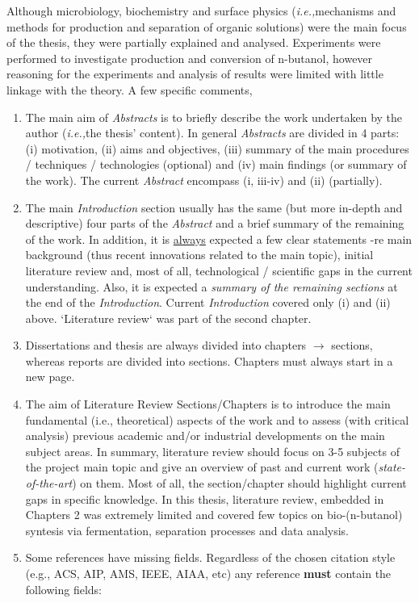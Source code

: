 \documentclass[14pt,twoside]{report}
\newcommand{\ie}{{\it i.e.,}}
\begin{document}
Although microbiology, biochemistry and surface physics (\ie mechanisms and methods for production and separation of organic solutions) were the main focus of the thesis, they were partially explained and analysed. Experiments were performed to investigate production and conversion of n-butanol, however reasoning for the experiments and analysis of results were limited with little linkage with the theory. A few specific comments,
\begin{enumerate}
%
\item The main aim of {\it Abstracts} is to briefly describe the work undertaken by the author (\ie the thesis' content). In general {\it Abstracts} are divided in 4 parts: (i) motivation, (ii) aims and objectives, (iii) summary of the main procedures / techniques / technologies (optional) and (iv) main findings (or summary of the work). The current {\it Abstract} encompass (i, iii-iv) and (ii) (partially).
%
\item The main {\it Introduction} section usually has the same (but more in-depth and descriptive) four parts of the {\it Abstract} and a brief summary of the remaining of the work. In addition, it is \underline{always} expected a few clear statements -re main background (thus recent innovations related to the main topic), initial literature review and, most of all, technological / scientific gaps in the current understanding. Also, it is expected a {\it summary of the remaining sections} at the end of the {\it Introduction}.  Current {\it Introduction} covered only (i) and (ii) above. `Literature review` was part of the second chapter.
%
\item Dissertations and thesis are always divided into chapters $\rightarrow$ sections, whereas reports are divided into sections. Chapters must always start in a new page.
%
\item The aim of Literature Review Sections/Chapters is to introduce the main fundamental (i.e., theoretical) aspects of the work and to assess (with critical analysis) previous academic and/or industrial developments on the main subject areas. In summary, literature review should focus on 3-5 subjects of the project main topic and give an overview of past and current work ({\it state-of-the-art}) on them. Most of all, the section/chapter should highlight current gaps in specific knowledge. In this thesis, literature review, embedded in Chapters 2 was extremely limited and covered few topics on bio-(n-butanol) syntesis via fermentation, separation processes and data analysis.
%
\item Some references have missing fields. Regardless of the chosen citation style (e.g., ACS, AIP, AMS, IEEE, AIAA, etc) any reference {\bf must} contain the following fields: 

\end{enumerate}
\end{document}

